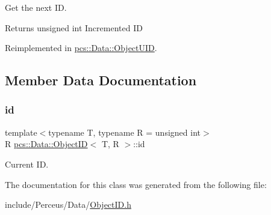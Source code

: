 Get the next ID. 

\begin{DoxyReturn}{Returns}
unsigned int Incremented ID 
\end{DoxyReturn}


Reimplemented in \hyperlink{classpcs_1_1Data_1_1ObjectUID_a1a1cc75b0ed7e6c04f2f5daa33e0193e}{pcs\+::\+Data\+::\+Object\+U\+ID}.



\subsection{Member Data Documentation}
\mbox{\label{classpcs_1_1Data_1_1ObjectID_a69a11bfb96a9078095de9bb139b06913}} 
\subsubsection{\texorpdfstring{id}{id}}
{\footnotesize\ttfamily template$<$typename T, typename R = unsigned int$>$ \\
R \hyperlink{classpcs_1_1Data_1_1ObjectID}{pcs\+::\+Data\+::\+Object\+ID}$<$ T, R $>$\+::id\hspace{0.3cm}{\ttfamily [protected]}}



Current ID. 



The documentation for this class was generated from the following file\+:\begin{DoxyCompactItemize}
\item 
include/\+Perceus/\+Data/\hyperlink{ObjectID_8h}{Object\+I\+D.\+h}\end{DoxyCompactItemize}
